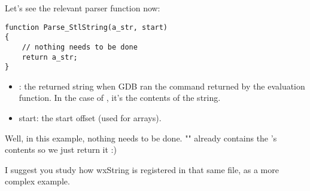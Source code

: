 Let's see the relevant parser function now:

\begin{lstlisting}
function Parse_StlString(a_str, start)
{
    // nothing needs to be done
    return a_str;
}
\end{lstlisting}

\begin{itemize}
\item {}: the returned string when GDB ran the command returned by the evaluation function. In the case of , it's the contents of the string.
\item start: the start offset (used for arrays).
\end{itemize}

Well, in this example, nothing needs to be done. "" already contains the 's contents so we just return it :)

I suggest you study how wxString is registered in that same file, as a more complex example. 